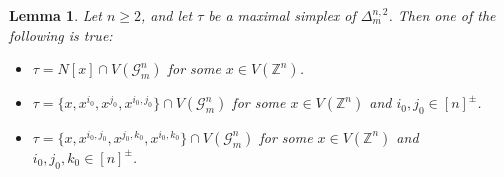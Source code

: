 \documentclass{amsart}
\newtheorem{lemma}[theorem]{Lemma}
\theoremstyle{definition}
\theoremstyle{remark}
\numberwithin{equation}{section}
\newcommand{\G}{\mathcal{G}}
\newcommand{\vr}[2]{\mathcal{VR}(#1;#2)}
\def\Z{{\mathbb{Z}}}
\newcommand{\raju}[1]{\textcolor{darkviolet!65!black}{#1}}
\begin{document}
\begin{lemma} \label{thm:maximalsimplex_m_case} 
	Let  $n \geq 2$, and let $\tau $ be a maximal simplex of $\Delta_m^{n,2}$. Then one of the following is true:
	\begin{itemize}
		\item[(i)] $\tau = N[x] \cap V(\G_m^n)$ for some $x \in V(\Z^n)$.
		\item[(ii)] $\tau = \{x, x^{i_0}, x^{j_0}, x^{i_0, j_0}\} \cap V(\G_m^n)$ for some $x \in V(\Z^n)$ and $i_0, j_0 \in [n]^{\pm}$.
		\item[(ii)] $\tau = \{x,x^{i_0,j_0},x^{j_0,k_0},x^{i_0,k_0}\}\cap V(\G_m^n)$ for some $x \in V(\Z^n)$ and $i_0, j_0, k_0 \in [n]^{\pm}$.
		
	\end{itemize}
\end{lemma}




	
	
\end{document}
